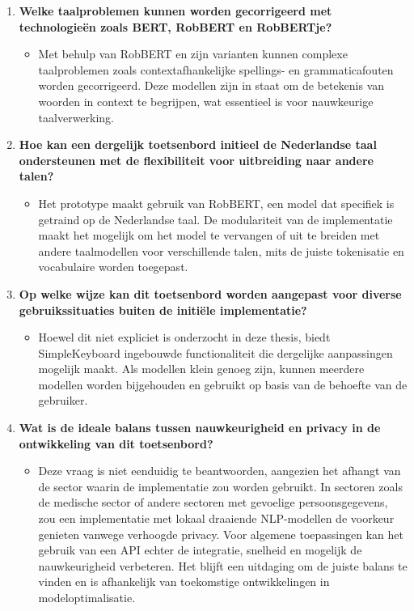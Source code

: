 \begin{enumerate}
    \item \textbf{Welke taalproblemen kunnen worden gecorrigeerd met technologieën zoals BERT, RobBERT en RobBERTje?}
    \begin{itemize}
        \item Met behulp van RobBERT en zijn varianten kunnen complexe taalproblemen zoals contextafhankelijke spellings- en grammaticafouten worden gecorrigeerd. Deze modellen zijn in staat om de betekenis van woorden in context te begrijpen, wat essentieel is voor nauwkeurige taalverwerking.
    \end{itemize}
    
    \item \textbf{Hoe kan een dergelijk toetsenbord initieel de Nederlandse taal ondersteunen met de flexibiliteit voor uitbreiding naar andere talen?}
    \begin{itemize}
        \item Het prototype maakt gebruik van RobBERT, een model dat specifiek is getraind op de Nederlandse taal. De modulariteit van de implementatie maakt het mogelijk om het model te vervangen of uit te breiden met andere taalmodellen voor verschillende talen, mits de juiste tokenisatie en vocabulaire worden toegepast.
    \end{itemize}
    
    \item \textbf{Op welke wijze kan dit toetsenbord worden aangepast voor diverse gebruikssituaties buiten de initiële implementatie?}
    \begin{itemize}
        \item Hoewel dit niet expliciet is onderzocht in deze thesis, biedt SimpleKeyboard ingebouwde functionaliteit die dergelijke aanpassingen mogelijk maakt. Als modellen klein genoeg zijn, kunnen meerdere modellen worden bijgehouden en gebruikt op basis van de behoefte van de gebruiker.
    \end{itemize}
    
    \item \textbf{Wat is de ideale balans tussen nauwkeurigheid en privacy in de ontwikkeling van dit toetsenbord?}
    \begin{itemize}
        \item Deze vraag is niet eenduidig te beantwoorden, aangezien het afhangt van de sector waarin de implementatie zou worden gebruikt. In sectoren zoals de medische sector of andere sectoren met gevoelige persoonsgegevens, zou een implementatie met lokaal draaiende NLP-modellen de voorkeur genieten vanwege verhoogde privacy. Voor algemene toepassingen kan het gebruik van een API echter de integratie, snelheid en mogelijk de nauwkeurigheid verbeteren. Het blijft een uitdaging om de juiste balans te vinden en is afhankelijk van toekomstige ontwikkelingen in modeloptimalisatie.
    \end{itemize}
    

\end{enumerate}
